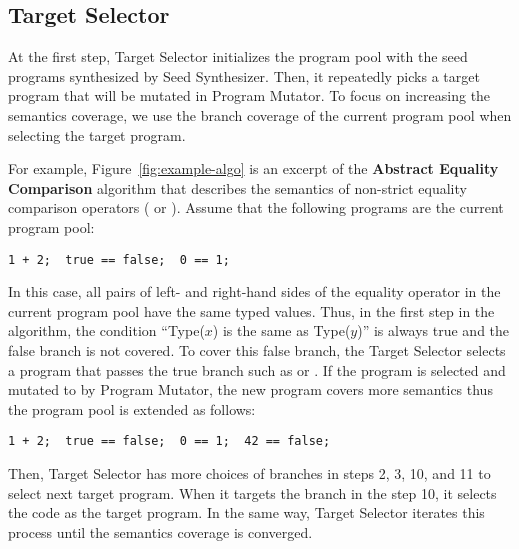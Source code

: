 \subsection{Target Selector}

At the first step, \textsf{Target Selector} initializes the program pool with
the seed programs synthesized by \textsf{Seed Synthesizer}.  Then, it repeatedly
picks a target program that will be mutated in \textsf{Program Mutator}.  To
focus on increasing the semantics coverage, we use the branch coverage
of the current program pool when selecting the target program.

For example, Figure~\ref{fig:example-algo} is an excerpt of the \textbf{Abstract
Equality Comparison} algorithm that describes the semantics of non-strict
equality comparison operators (\code{==} or \code{!=}).  Assume that the
following programs are the current program pool:
\begin{lstlisting}[style=myJSstyle]
1 + 2;  true == false;  0 == 1;
\end{lstlisting}
In this case, all pairs of left- and right-hand sides of the equality operator
in the current program pool have the same typed values.  Thus, in the first step
in the algorithm, the condition ``Type($x$) is the same as Type($y$)'' is always
true and the false branch is not covered.  To cover this false branch, the
\textsf{Target Selector} selects a program that passes the true branch such as
 or .  If the program  is
selected and mutated to  by \textsf{Program Mutator}, the
new program covers more semantics thus the program pool is extended as follows:
\begin{lstlisting}[style=myJSstyle]
1 + 2;  true == false;  0 == 1;  42 == false;
\end{lstlisting}
Then, \textsf{Target Selector} has more choices of branches in steps 2, 3, 10,
and 11 to select next target program.  When it targets the branch in the step
10, it selects the code  as the target program.  In the same
way, \textsf{Target Selector} iterates this process until the semantics coverage
is converged.

